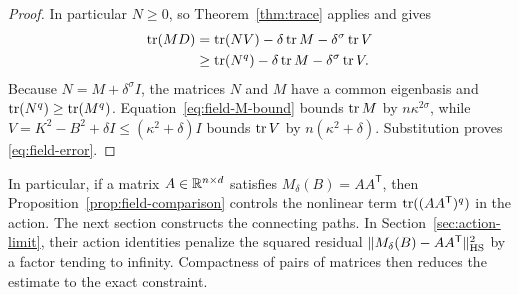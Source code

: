 \begin{proof}
In particular $N\geq0$, so Theorem~\ref{thm:trace} applies and gives
\begin{align*}
 \operatorname{tr}(MD)
 &=\operatorname{tr}(NV)-\delta\operatorname{tr} M-\delta^\sigma\operatorname{tr} V\\
 &\geq\operatorname{tr}(N^q)-\delta\operatorname{tr} M-\delta^\sigma\operatorname{tr} V.
\end{align*}
Because $N=M+\delta^\sigma I$, the matrices $N$ and $M$ have a
common eigenbasis and $\operatorname{tr}(N^q)\geq\operatorname{tr}(M^q)$.
Equation~\eqref{eq:field-M-bound} bounds $\operatorname{tr} M$ by
$n\kappa^{2\sigma}$, while
$V=K^2-B^2+\delta I\leq(\kappa^2+\delta)I$ bounds $\operatorname{tr} V$ by
$n(\kappa^2+\delta)$.  Substitution proves
\eqref{eq:field-error}.
\end{proof}

In particular, if a matrix $A\in\mathbb R^{n\times d}$ satisfies
$M_\delta(B)=AA^{\mathsf T}$, then
Proposition~\ref{prop:field-comparison} controls the nonlinear term
$\operatorname{tr}((AA^{\mathsf T})^q)$ in the action.  The next section constructs
the connecting paths.  In Section~\ref{sec:action-limit}, their action
identities penalize the squared residual
$\|M_\delta(B)-AA^{\mathsf T}\|_{\mathrm{HS}}^2$ by a factor tending to infinity.
Compactness of pairs of matrices then reduces the estimate to the exact
constraint.
